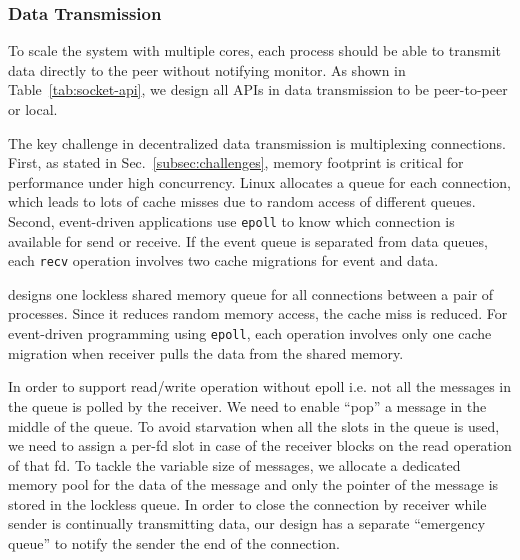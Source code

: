

\subsubsection{Data Transmission}
\label{subsubsec:data_trans}

To scale the system with multiple cores, each process should be able to transmit data directly to the peer without notifying monitor. As shown in Table~\ref{tab:socket-api}, we design all APIs in data transmission to be peer-to-peer or local.

The key challenge in decentralized data transmission is multiplexing connections. First, as stated in Sec.~\ref{subsec:challenges}, memory footprint is critical for performance under high concurrency. Linux allocates a queue for each connection, which leads to lots of cache misses due to random access of different queues. Second, event-driven applications use \texttt{epoll} to know which connection is available for send or receive. If the event queue is separated from data queues, each \texttt{recv} operation involves two cache migrations for event and data.

\libipc designs one lockless shared memory queue for all connections between a pair of processes. Since it reduces random memory access, the cache miss is reduced. For event-driven programming using \texttt{epoll}, each operation involves only one cache migration when receiver pulls the data from the shared memory.

In order to support read/write operation without epoll i.e. not all the messages in the queue is polled by the receiver. We need to enable ``pop'' a message in the middle of the queue. To avoid starvation when all the slots in the queue is used, we need to assign a per-fd slot in case of the receiver blocks on the read operation of that fd. To tackle the variable size of messages, we allocate a dedicated memory pool for the data of the message and only the pointer of the message is stored in the lockless queue. In order to close the connection by receiver while sender is continually transmitting data, our design has a separate ``emergency queue'' to notify the sender the end of the connection.

